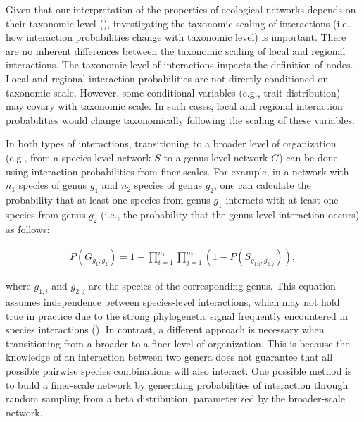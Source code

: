 \begin{box2.4}

Given that our interpretation of the properties of ecological networks depends
on their taxonomic level (\cite{Melian2011Ecoevolutionary}), investigating the
taxonomic scaling of interactions (i.e., how interaction probabilities change with
taxonomic level) is important. There are no inherent differences between the
taxonomic scaling of local and regional interactions. The taxonomic level of
interactions impacts the definition of nodes. Local and regional interaction
probabilities are not directly conditioned on taxonomic scale. However, some
conditional variables (e.g., trait distribution) may covary with taxonomic
scale. In such cases, local and regional interaction probabilities would change
taxonomically following the scaling of these variables.

In both types of interactions, transitioning to a broader level of organization
(e.g., from a species-level network $S$ to a genus-level network $G$) can be
done using interaction probabilities from finer scales. For example, in a
network with $n_1$ species of genus $g_1$ and $n_2$ species of genus $g_2$, one
can calculate the probability that at least one species from genus $g_1$
interacts with at least one species from genus $g_2$ (i.e., the probability that
the genus-level interaction occurs) as follows:

\begin{eqnarray}
  \label{eq:taxo}
  P(G_{g_1, g_2}) = 1 - \prod_{i = 1}^{n_1}\prod_{j = 1}^{n_2}(1 -
P(S_{g_{1,i}, g_{2,j}})),
\end{eqnarray}

where $g_{1,i}$ and $g_{2,j}$ are the species of the corresponding genus. This
equation assumes independence between species-level interactions, which may not
hold true in practice due to the strong phylogenetic signal frequently
encountered in species interactions (\cite{Gomez2010Ecological}). In contrast, a
different approach is necessary when transitioning from a broader to a finer
level of organization. This is because the knowledge of an interaction between
two genera does not guarantee that all possible pairwise species combinations
will also interact. One possible method is to build a finer-scale network by
generating probabilities of interaction through random sampling from a beta
distribution, parameterized by the broader-scale network.


\end{box2.4}
